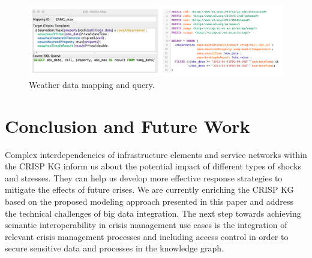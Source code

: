 \documentclass[
]{ceurart}
\begin{document}
\begin{figure}
  \centering
  \includegraphics[width=\linewidth]{images/ZAMG_mapping.png}
  \caption{Weather data mapping and query.}
  \label{zamg_mapping}
\end{figure}



\section{Conclusion and Future Work}

Complex interdependencies of infrastructure elements and service networks within the CRISP KG inform us about the potential impact of different types of shocks and stresses. They can help us develop more effective response strategies to mitigate the effects of future crises. We are currently enriching the CRISP KG based on the proposed modeling approach presented in this paper and address the technical challenges of big data integration. The next step towards achieving semantic interoperability in crisis management use cases is the integration of relevant crisis management processes and including access control in order to secure sensitive data and processes in the knowledge graph.




\begin{acknowledgments}
\end{acknowledgments}



\appendix
\end{document}
